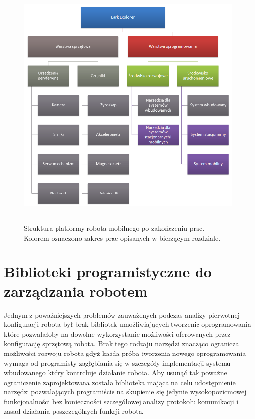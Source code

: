 \begin{figure}[!ht]
 \centering
 \includegraphics[height=125mm]{../images/ch03/dark_explorer_platform_ide_stac_mob.png}
 \caption{Struktura platformy robota mobilnego po zakończeniu prac. Kolorem oznaczono zakres prac opisanych w bierzącym rozdziale.}
 \label{fig:DarkExplorerPlatformStacMob}
\end{figure}

\section{Biblioteki programistyczne do zarządzania robotem}
Jednym z poważniejszych problemów zauważonych podczas analizy pierwotnej
konfiguracji robota był brak bibliotek umożliwiających tworzenie oprogramowania
które pozwalałoby na dowolne wykorzystanie możliwości oferowanych przez
konfigurację sprzętową robota. Brak tego rodzaju narzędzi znacząco ogranicza
możliwości rozwoju robota gdyż każda próba tworzenia nowego oprogramowania wymaga
od programisty zagłębiania się w szczegóły implementacji systemu wbudowanego
który kontroluje działanie robota. Aby usunąć tak poważne ograniczenie
zaprojektowana została biblioteka mająca na celu udostępnienie narzędzi
pozwalających programiście na skupienie się jedynie wysokopoziomowej
funkcjonalności bez konieczności szczegółowej analizy protokołu komunikacji i
zasad działania poszczególnych funkcji robota.

